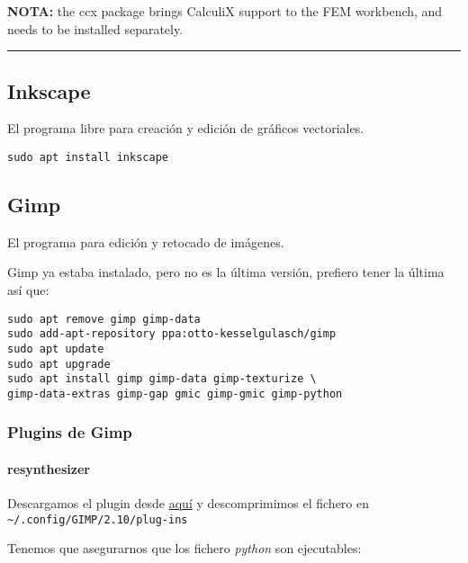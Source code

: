 \documentclass[
  12pt,
  spanish,
]{article}
\begin{document}
\textbf{NOTA:} the ccx package brings CalculiX support to the FEM
workbench, and needs to be installed separately.

\begin{center}\rule{0.5\linewidth}{\linethickness}\end{center}

\hypertarget{inkscape}{%
\subsection{Inkscape}\label{inkscape}}

El programa libre para creación y edición de gráficos vectoriales.

\begin{verbatim}
sudo apt install inkscape
\end{verbatim}

\hypertarget{gimp}{%
\subsection{Gimp}\label{gimp}}

El programa para edición y retocado de imágenes.

Gimp ya estaba instalado, pero no es la última versión, prefiero tener
la última así que:

\begin{verbatim}
sudo apt remove gimp gimp-data
sudo add-apt-repository ppa:otto-kesselgulasch/gimp
sudo apt update
sudo apt upgrade
sudo apt install gimp gimp-data gimp-texturize \
gimp-data-extras gimp-gap gmic gimp-gmic gimp-python
\end{verbatim}

\hypertarget{plugins-de-gimp}{%
\subsubsection{Plugins de Gimp}\label{plugins-de-gimp}}

\hypertarget{resynthesizer}{%
\paragraph{resynthesizer}\label{resynthesizer}}

Descargamos el plugin desde
\href{https://github.com/bootchk/resynthesizer}{aquí} y descomprimimos
el fichero en \texttt{\textasciitilde{}/.config/GIMP/2.10/plug-ins}

Tenemos que asegurarnos que los fichero \emph{python} son ejecutables:
\end{document}
